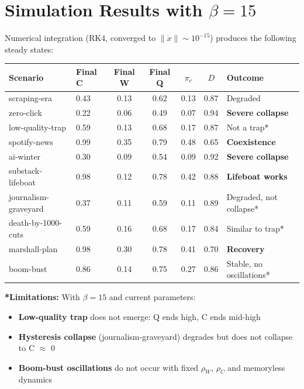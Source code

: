 \documentclass[11pt]{article}
\begin{document}
\section{Simulation Results with $\beta=15$}

Numerical integration (RK4, converged to $\|\dot{x}\| \sim 10^{-15}$) produces the following steady states:

\begin{center}
\small
\begin{tabular}{llccccl}
\toprule
\textbf{Scenario} & \textbf{Final C} & \textbf{Final W} & \textbf{Final Q} & $\pi_c$ & $D$ & \textbf{Outcome} \\
\midrule
scraping-era & 0.43 & 0.13 & 0.62 & 0.13 & 0.87 & Degraded \\
zero-click & 0.22 & 0.06 & 0.49 & 0.07 & 0.94 & \textbf{Severe collapse} \\
low-quality-trap & 0.59 & 0.13 & 0.68 & 0.17 & 0.87 & Not a trap* \\
spotify-news & 0.99 & 0.35 & 0.79 & 0.48 & 0.65 & \textbf{Coexistence} \\
ai-winter & 0.30 & 0.09 & 0.54 & 0.09 & 0.92 & \textbf{Severe collapse} \\
substack-lifeboat & 0.98 & 0.12 & 0.78 & 0.42 & 0.88 & \textbf{Lifeboat works} \\
journalism-graveyard & 0.37 & 0.11 & 0.59 & 0.11 & 0.89 & Degraded, not collapse* \\
death-by-1000-cuts & 0.59 & 0.16 & 0.68 & 0.17 & 0.84 & Similar to trap* \\
marshall-plan & 0.98 & 0.30 & 0.78 & 0.41 & 0.70 & \textbf{Recovery} \\
boom-bust & 0.86 & 0.14 & 0.75 & 0.27 & 0.86 & Stable, no oscillations* \\
\bottomrule
\end{tabular}
\end{center}

\textbf{*Limitations:} With $\beta=15$ and current parameters:
\begin{itemize}
    \item \textbf{Low-quality trap} does not emerge: Q ends high, C ends mid-high
    \item \textbf{Hysteresis collapse} (journalism-graveyard) degrades but does not collapse to C $\approx$ 0
    \item \textbf{Boom-bust oscillations} do not occur with fixed $\rho_W$, $\rho_C$ and memoryless dynamics
\end{itemize}
\end{document}
